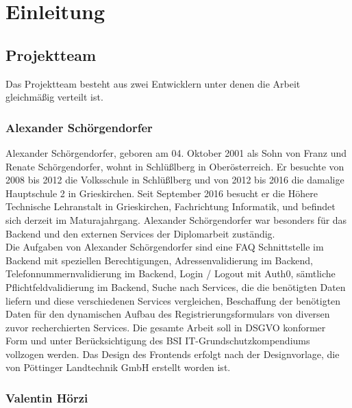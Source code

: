 \chapter{Einleitung} \label{sec:einleitung}
\section{Projektteam}
Das Projektteam besteht aus zwei Entwicklern unter denen die Arbeit gleichmäßig verteilt ist.
\subsection{Alexander Schörgendorfer}
Alexander Schörgendorfer, geboren am 04. Oktober 2001 als Sohn von Franz und Renate Schörgendorfer, wohnt in Schlüßlberg in Oberösterreich. Er besuchte von 2008 bis 2012 die Volksschule in Schlüßlberg und von 2012 bis 2016 die damalige Hauptschule 2 in Grieskirchen. Seit September 2016 besucht er die Höhere Technische Lehranstalt in Grieskirchen, Fachrichtung Informatik, und befindet sich derzeit im Maturajahrgang. Alexander Schörgendorfer war besonders für das Backend und den externen Services der Diplomarbeit zuständig.\\
Die Aufgaben von Alexander Schörgendorfer sind eine FAQ Schnittstelle im Backend mit speziellen Berechtigungen, Adressenvalidierung im Backend, Telefonnummernvalidierung im Backend, Login / Logout mit Auth0, sämtliche Pflichtfeldvalidierung im Backend, Suche nach Services, die die benötigten Daten liefern und diese verschiedenen Services vergleichen, Beschaffung der benötigten Daten für den dynamischen Aufbau des Registrierungsformulars von diversen zuvor recherchierten Services. Die gesamte Arbeit soll in DSGVO konformer Form und unter Berücksichtigung des BSI IT-Grundschutzkompendiums vollzogen werden. Das Design des Frontends erfolgt nach der Designvorlage, die von Pöttinger Landtechnik GmbH erstellt worden ist.
\subsection{Valentin Hörzi}


